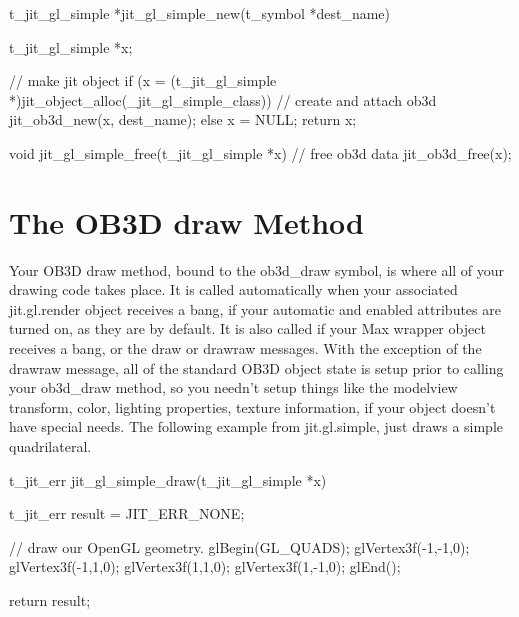 \begin{DoxyCode}
t_jit_gl_simple *jit_gl_simple_new(t_symbol *dest_name)
{
   t_jit_gl_simple *x;

   // make jit object
   if (x = (t_jit_gl_simple *)jit_object_alloc(_jit_gl_simple_class)) 
   {
      // create and attach ob3d
      jit_ob3d_new(x, dest_name);
   } 
   else 
   {
      x = NULL;
   }   
   return x;
}


void jit_gl_simple_free(t_jit_gl_simple *x)
{
   // free ob3d data 
   jit_ob3d_free(x);
}
\end{DoxyCode}
\hypertarget{chapter_jit_ob3dqs_chapter_jit_ob3dqs_draw}{}\section{The OB3D draw Method}\label{chapter_jit_ob3dqs_chapter_jit_ob3dqs_draw}
Your OB3D draw method, bound to the ob3d\_\-draw symbol, is where all of your drawing code takes place. It is called automatically when your associated jit.gl.render object receives a bang, if your automatic and enabled attributes are turned on, as they are by default. It is also called if your Max wrapper object receives a bang, or the draw or drawraw messages. With the exception of the drawraw message, all of the standard OB3D object state is setup prior to calling your ob3d\_\-draw method, so you needn't setup things like the modelview transform, color, lighting properties, texture information, if your object doesn't have special needs. The following example from jit.gl.simple, just draws a simple quadrilateral.


\begin{DoxyCode}
t_jit_err jit_gl_simple_draw(t_jit_gl_simple *x)
{
   t_jit_err result = JIT_ERR_NONE;
   
   // draw our OpenGL geometry. 
   glBegin(GL_QUADS);
   glVertex3f(-1,-1,0);
   glVertex3f(-1,1,0);
   glVertex3f(1,1,0);
   glVertex3f(1,-1,0);
   glEnd();
   
   return result;
}
\end{DoxyCode}


